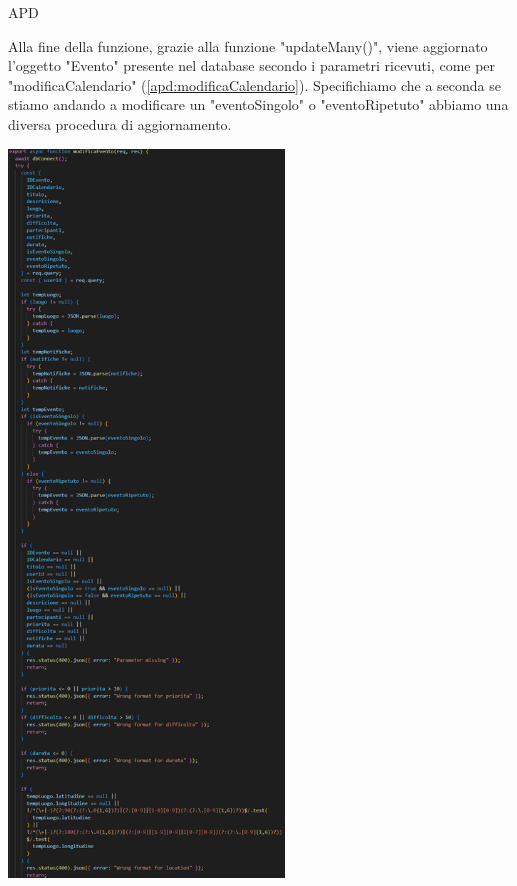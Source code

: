 \begin{listaPersonale} {APD}
\begin{listaPersonale2}[APD]{}
                Alla fine della funzione, grazie alla funzione "updateMany()", viene aggiornato l'oggetto "Evento" presente nel database secondo i parametri ricevuti, come per "modificaCalendario" (\ref{apd:modificaCalendario}). Specifichiamo che a seconda se stiamo andando a modificare un "eventoSingolo" o "eventoRipetuto" abbiamo una diversa procedura di aggiornamento.
                \begin{center}
                    \includegraphics[width=0.55\textwidth, height=0.9\textheight]{img/png/APIs/modificaEvento.png}
                \end{center}
                \begin{center}

\end{center}
\end{listaPersonale2}
\end{listaPersonale}
